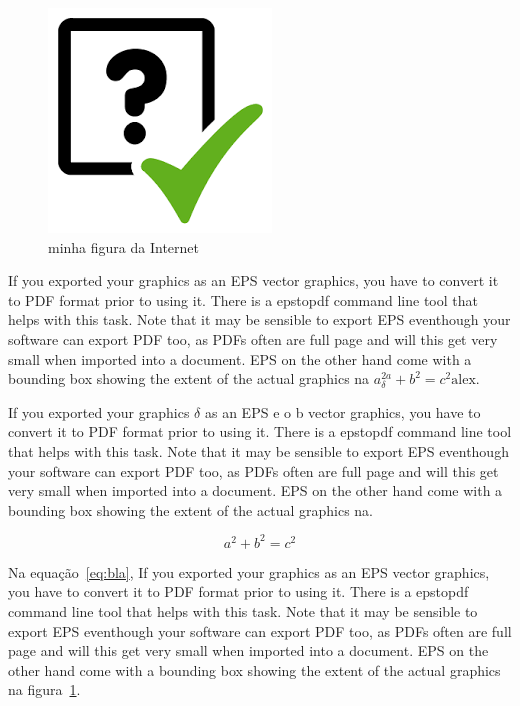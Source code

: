 \documentclass[a4page,12pt]{article}
\begin{document}
\begin{figure}
  \begin{center}
    \includegraphics[angle=45,width=.5\textwidth]{teste.png}
    \caption{minha figura da Internet}\label{fig:w}
  \end{center}
\end{figure}

If you exported your graphics as an EPS vector graphics, you have to convert it to PDF format prior to using it. There is a epstopdf command line tool that helps with this task. Note that it may be sensible to export EPS eventhough your software can export PDF too, as PDFs often are full page and will this get very small when imported into a document. EPS on the other hand come with a bounding box showing the extent of the actual graphics na $a_{\delta}^{2a} + b^2 = c^2 \text{alex}$.

If you exported your graphics $\delta$ as an EPS e o b vector graphics, you have to convert it to PDF format prior to using it. There is a epstopdf command line tool that helps with this task. Note that it may be sensible to export EPS eventhough your software can export PDF too, as PDFs often are full page and will this get very small when imported into a document. EPS on the other hand come with a bounding box showing the extent of the actual graphics na.

\begin{equation}\label{eq:bla}
  a^2 + b^2 = c^2
\end{equation}

Na equação~\ref{eq:bla}, If you exported your graphics as an EPS vector graphics, you have to convert it to PDF format prior to using it. There is a epstopdf command line tool that helps with this task. Note that it may be sensible to export EPS eventhough your software can export PDF too, as PDFs often are full page and will this get very small when imported into a document. EPS on the other hand come with a bounding box showing the extent of the actual graphics na figura~\ref{fig:w}.
\end{document}
